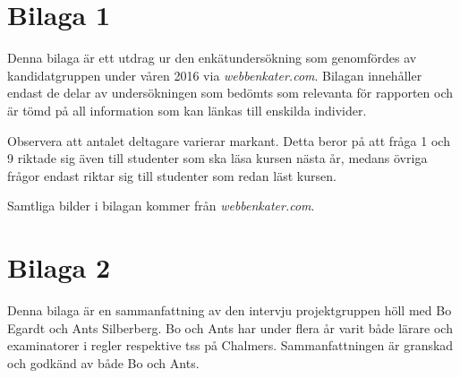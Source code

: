 \documentclass[12pt,a4paper,twoside,openright]{article}
\begin{document}

\section{Bilaga 1}
\label{bil:1}
Denna bilaga är ett utdrag ur den enkätundersökning som genomfördes av
kandidatgruppen under våren 2016 via \textit{webbenkater.com}. Bilagan
innehåller endast de delar av undersökningen som bedömts som relevanta
för rapporten och är tömd på all information som kan länkas till
enskilda individer.

Observera att antalet deltagare varierar markant. Detta beror på att
fråga 1 och 9 riktade sig även till studenter som ska läsa kursen
nästa år, medans övriga frågor endast riktar sig till studenter som
redan läst kursen.

Samtliga bilder i bilagan kommer från
\textit{webbenkater.com}.


\newpage

\section{Bilaga 2}
\label{bil:exam_intervju}
Denna bilaga är en sammanfattning av den intervju projektgruppen höll
med Bo Egardt och Ants Silberberg. Bo och Ants har under flera år
varit både lärare och examinatorer i \gls{regler} respektive
\gls{tss} på Chalmers. Sammanfattningen är granskad och godkänd av
både Bo och Ants.

\newpage
\end{document}
